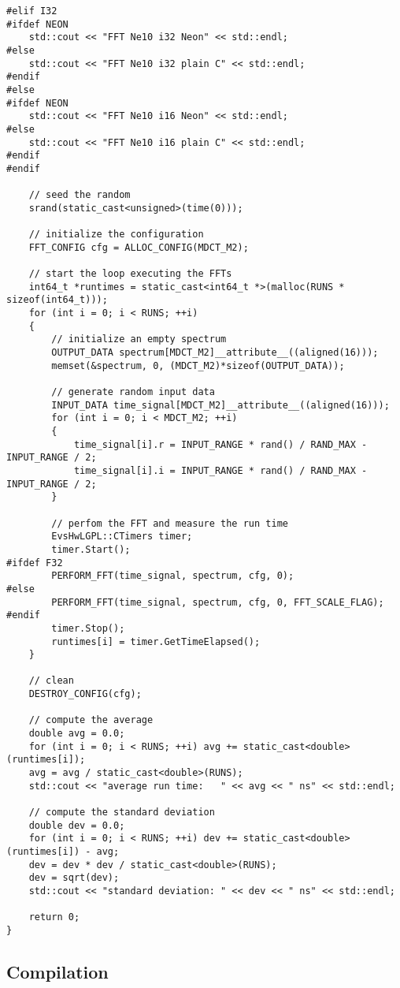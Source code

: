 \documentclass{article}
\begin{document}
\begin{lstlisting}
#elif I32
#ifdef NEON
    std::cout << "FFT Ne10 i32 Neon" << std::endl;
#else
    std::cout << "FFT Ne10 i32 plain C" << std::endl;
#endif
#else
#ifdef NEON
    std::cout << "FFT Ne10 i16 Neon" << std::endl;
#else
    std::cout << "FFT Ne10 i16 plain C" << std::endl;
#endif
#endif

    // seed the random
    srand(static_cast<unsigned>(time(0)));

    // initialize the configuration
    FFT_CONFIG cfg = ALLOC_CONFIG(MDCT_M2);

    // start the loop executing the FFTs
    int64_t *runtimes = static_cast<int64_t *>(malloc(RUNS * sizeof(int64_t)));
    for (int i = 0; i < RUNS; ++i)
    {
        // initialize an empty spectrum
        OUTPUT_DATA spectrum[MDCT_M2]__attribute__((aligned(16)));
        memset(&spectrum, 0, (MDCT_M2)*sizeof(OUTPUT_DATA));

        // generate random input data
        INPUT_DATA time_signal[MDCT_M2]__attribute__((aligned(16)));
        for (int i = 0; i < MDCT_M2; ++i)
        {
            time_signal[i].r = INPUT_RANGE * rand() / RAND_MAX - INPUT_RANGE / 2;
            time_signal[i].i = INPUT_RANGE * rand() / RAND_MAX - INPUT_RANGE / 2;
        }

        // perfom the FFT and measure the run time
        EvsHwLGPL::CTimers timer;
        timer.Start();
#ifdef F32
        PERFORM_FFT(time_signal, spectrum, cfg, 0);
#else
        PERFORM_FFT(time_signal, spectrum, cfg, 0, FFT_SCALE_FLAG);
#endif
        timer.Stop();
        runtimes[i] = timer.GetTimeElapsed();
    }

    // clean
    DESTROY_CONFIG(cfg);

    // compute the average
    double avg = 0.0;
    for (int i = 0; i < RUNS; ++i) avg += static_cast<double>(runtimes[i]);
    avg = avg / static_cast<double>(RUNS);
    std::cout << "average run time:   " << avg << " ns" << std::endl;

    // compute the standard deviation
    double dev = 0.0;
    for (int i = 0; i < RUNS; ++i) dev += static_cast<double>(runtimes[i]) - avg;
    dev = dev * dev / static_cast<double>(RUNS);
    dev = sqrt(dev);
    std::cout << "standard deviation: " << dev << " ns" << std::endl;

    return 0;
}
\end{lstlisting}

\subsection{Compilation}\label{app:perf_fft_ne10_cmake}
\end{document}
